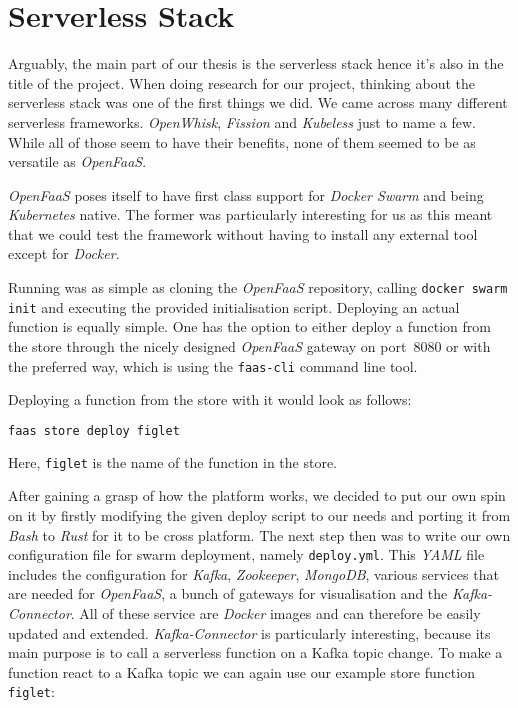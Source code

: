 \section{Serverless Stack}

Arguably, the main part of our thesis is the serverless stack hence it's also in the title of the
project. When doing research for our project, thinking about the serverless stack was one of the
first things we did. We came across many different serverless frameworks. \textit{OpenWhisk},
\textit{Fission} and \textit{Kubeless} just to name a few. While all of those seem to have their
benefits, none of them seemed to be as versatile as \textit{OpenFaaS}.

\textit{OpenFaaS} poses itself to have first class support for \textit{Docker Swarm} and being
\textit{Kubernetes} native. The former was particularly interesting for us as this meant that we
could test the framework without having to install any external tool except for  \textit{Docker}.

Running was as simple as cloning the \textit{OpenFaaS} repository, calling \texttt{docker swarm
init} and executing the provided initialisation script. Deploying an actual function is equally
simple. One has the option to either deploy a function from the store through the nicely designed
\textit{OpenFaaS} gateway on port~8080 or with the preferred way, which is using the
\texttt{faas-cli} command line tool.

Deploying a function from the store with it would look as follows:

\begin{lstlisting}[language=bash]
faas store deploy figlet
\end{lstlisting}

Here, \texttt{figlet} is the name of the function in the store.

After gaining a grasp of how the platform works, we decided to put our own spin on it by firstly
modifying the given deploy script to our needs and porting it from \textit{Bash} to \textit{Rust}
for it to be cross platform. The next step then was to write our own configuration file for swarm
deployment, namely \texttt{deploy.yml}. This \textit{YAML} file includes the configuration for
\textit{Kafka}, \textit{Zookeeper}, \textit{MongoDB}, various services that are needed for
\textit{OpenFaaS}, a bunch of gateways for visualisation and the \textit{Kafka-Connector}. All of
these service are \textit{Docker} images and can therefore be easily updated and extended.
\textit{Kafka-Connector} is particularly interesting, because its main purpose is to call a
serverless function on a Kafka topic change. To make a function react to a Kafka topic we can again
use our example store function \texttt{figlet}:

